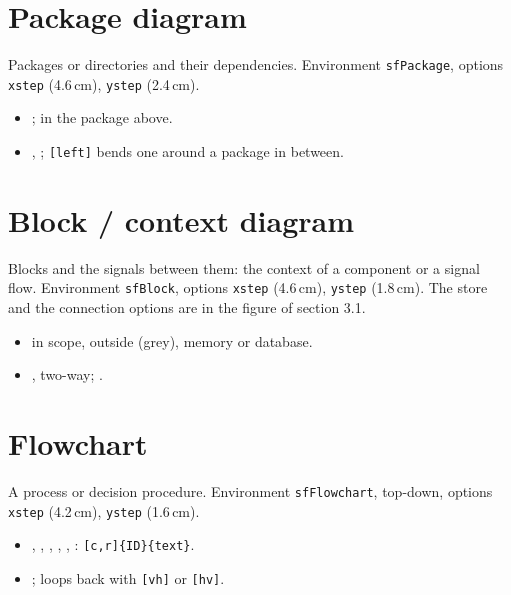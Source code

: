 
\section{Package diagram}

Packages or directories and their dependencies. Environment \texttt{sfPackage}, options \texttt{xstep} (4.6\,cm), \texttt{ystep} (2.4\,cm).

\begin{itemize}
  \item {};  in the package above.
  \item {}, ; \texttt{[left]} bends one around a package in between.
\end{itemize}


\section{Block / context diagram}

Blocks and the signals between them: the context of a component or a signal flow. Environment \texttt{sfBlock}, options \texttt{xstep} (4.6\,cm), \texttt{ystep} (1.8\,cm). The store and the connection options are in the figure of section 3.1.

\begin{itemize}
  \item {} in scope,  outside (grey),  memory or database.
  \item {},  two-way; .
\end{itemize}


\section{Flowchart}

A process or decision procedure. Environment \texttt{sfFlowchart}, top-down, options \texttt{xstep} (4.2\,cm), \texttt{ystep} (1.6\,cm).

\begin{itemize}
  \item {}, , , , , : \texttt{[c,r]\{ID\}\{text\}}.
  \item {}; loops back with \texttt{[vh]} or \texttt{[hv]}.
\end{itemize}

